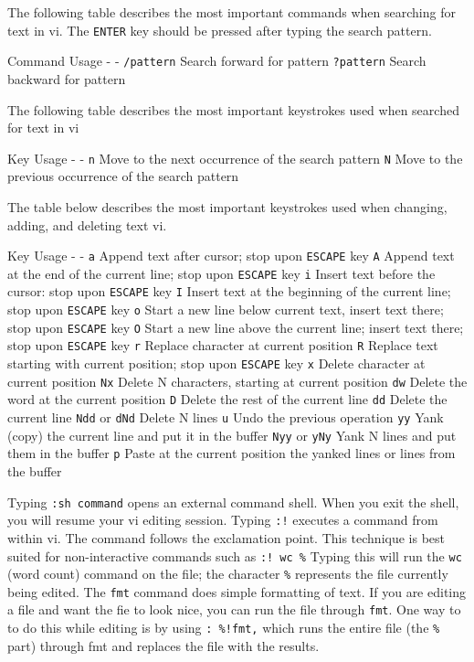 The following table describes the most important commands when searching
for text in vi. The \texttt{ENTER} key should be pressed after typing
the search pattern.

Command \textbar{} Usage - \textbar{} - \texttt{/pattern} \textbar{}
Search forward for pattern \texttt{?pattern} \textbar{} Search backward
for pattern

The following table describes the most important keystrokes used when
searched for text in vi

Key \textbar{} Usage - \textbar{} - \texttt{n} \textbar{} Move to the
next occurrence of the search pattern \texttt{N} \textbar{} Move to the
previous occurrence of the search pattern

The table below describes the most important keystrokes used when
changing, adding, and deleting text vi.

Key \textbar{} Usage - \textbar{} - \texttt{a} \textbar{} Append text
after cursor; stop upon \texttt{ESCAPE} key \texttt{A} \textbar{} Append
text at the end of the current line; stop upon \texttt{ESCAPE} key
\texttt{i} \textbar{} Insert text before the cursor: stop upon
\texttt{ESCAPE} key \texttt{I} \textbar{} Insert text at the beginning
of the current line; stop upon \texttt{ESCAPE} key \texttt{o} \textbar{}
Start a new line below current text, insert text there; stop upon
\texttt{ESCAPE} key \texttt{O} \textbar{} Start a new line above the
current line; insert text there; stop upon \texttt{ESCAPE} key
\texttt{r} \textbar{} Replace character at current position \texttt{R}
\textbar{} Replace text starting with current position; stop upon
\texttt{ESCAPE} key \texttt{x} \textbar{} Delete character at current
position \texttt{Nx} \textbar{} Delete N characters, starting at current
position \texttt{dw} \textbar{} Delete the word at the current position
\texttt{D} \textbar{} Delete the rest of the current line \texttt{dd}
\textbar{} Delete the current line \texttt{Ndd} or \texttt{dNd}
\textbar{} Delete N lines \texttt{u} \textbar{} Undo the previous
operation \texttt{yy} \textbar{} Yank (copy) the current line and put it
in the buffer \texttt{Nyy} or \texttt{yNy} \textbar{} Yank N lines and
put them in the buffer \texttt{p} \textbar{} Paste at the current
position the yanked lines or lines from the buffer

Typing \texttt{:sh command} opens an external command shell. When you
exit the shell, you will resume your vi editing session. Typing
\texttt{:!} executes a command from within vi. The command follows the
exclamation point. This technique is best suited for non-interactive
commands such as \texttt{:! wc \%} Typing this will run the \texttt{wc}
(word count) command on the file; the character \texttt{\%} represents
the file currently being edited. The \texttt{fmt} command does simple
formatting of text. If you are editing a file and want the fie to look
nice, you can run the file through \texttt{fmt}. One way to to do this
while editing is by using \texttt{: \%!fmt,} which runs the entire file
(the \texttt{\%} part) through fmt and replaces the file with the
results.

